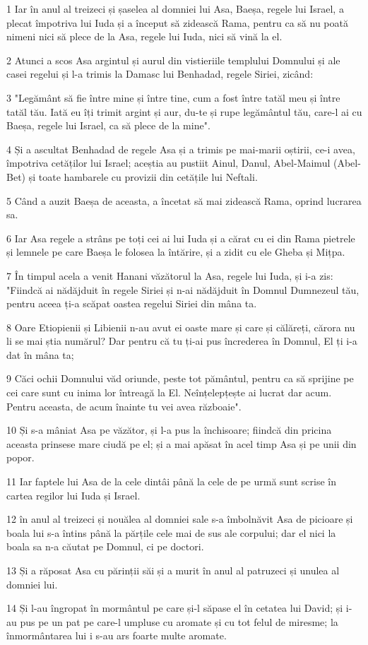 \par 1 Iar în anul al treizeci și șaselea al domniei lui Asa, Baeșa, regele lui Israel, a plecat împotriva lui Iuda și a început să zidească Rama, pentru ca să nu poată nimeni nici să plece de la Asa, regele lui Iuda, nici să vină la el.
\par 2 Atunci a scos Asa argintul și aurul din vistieriile templului Domnului și ale casei regelui și l-a trimis la Damasc lui Benhadad, regele Siriei, zicând:
\par 3 "Legământ să fie între mine și între tine, cum a fost între tatăl meu și între tatăl tău. Iată eu îți trimit argint și aur, du-te și rupe legământul tău, care-l ai cu Baeșa, regele lui Israel, ca să plece de la mine".
\par 4 Și a ascultat Benhadad de regele Asa și a trimis pe mai-marii oștirii, ce-i avea, împotriva cetăților lui Israel; aceștia au pustiit Ainul, Danul, Abel-Maimul (Abel-Bet) și toate hambarele cu provizii din cetățile lui Neftali.
\par 5 Când a auzit Baeșa de aceasta, a încetat să mai zidească Rama, oprind lucrarea sa.
\par 6 Iar Asa regele a strâns pe toți cei ai lui Iuda și a cărat cu ei din Rama pietrele și lemnele pe care Baeșa le folosea la întărire, și a zidit cu ele Gheba și Mițpa.
\par 7 În timpul acela a venit Hanani văzătorul la Asa, regele lui Iuda, și i-a zis: "Fiindcă ai nădăjduit în regele Siriei și n-ai nădăjduit în Domnul Dumnezeul tău, pentru aceea ți-a scăpat oastea regelui Siriei din mâna ta.
\par 8 Oare Etiopienii și Libienii n-au avut ei oaste mare și care și călăreți, cărora nu li se mai știa numărul? Dar pentru că tu ți-ai pus încrederea în Domnul, El ți i-a dat în mâna ta;
\par 9 Căci ochii Domnului văd oriunde, peste tot pământul, pentru ca să sprijine pe cei care sunt cu inima lor întreagă la El. Neînțelepțește ai lucrat dar acum. Pentru aceasta, de acum înainte tu vei avea războaie".
\par 10 Și s-a mâniat Asa pe văzător, și l-a pus la închisoare; fiindcă din pricina aceasta prinsese mare ciudă pe el; și a mai apăsat în acel timp Asa și pe unii din popor.
\par 11 Iar faptele lui Asa de la cele dintâi până la cele de pe urmă sunt scrise în cartea regilor lui Iuda și Israel.
\par 12 în anul al treizeci și nouălea al domniei sale s-a îmbolnăvit Asa de picioare și boala lui s-a întins până la părțile cele mai de sus ale corpului; dar el nici la boala sa n-a căutat pe Domnul, ci pe doctori.
\par 13 Și a răposat Asa cu părinții săi și a murit în anul al patruzeci și unulea al domniei lui.
\par 14 Și l-au îngropat în mormântul pe care și-l săpase el în cetatea lui David; și i-au pus pe un pat pe care-l umpluse cu aromate și cu tot felul de miresme; la înmormântarea lui i s-au ars foarte multe aromate.

